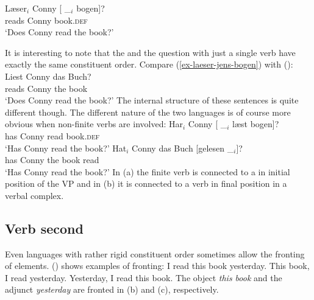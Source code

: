 \ex
\gll Læser$_i$ Conny [ \_$_i$ bogen]?\\
     reads     Conny {}        {}     book.\textsc{def}\\
\glt `Does Conny read the book?'
\zl

\noindent
It is interesting to note that the  and the  question with just a single verb have exactly
the same constituent order. Compare (\ref{ex-laeser-jens-bogen}) with ():
\ea
\gll Liest Conny das Buch?\\
     reads Conny the book\\ \german
\glt `Does Conny read the book?'
\z
The internal structure of these sentences is quite different though. The different nature of the two
languages is of course more obvious when non-finite verbs are involved:
\eal
\ex
\gll Har$_i$ Conny [ \_$_i$ læst bogen]?\\
     has Conny {} {} read book.\textsc{def}\\\danish
\glt `Has Conny read the book?'
\ex
\gll Hat$_i$ Conny das Buch [gelesen \_$_i$]?\\
     has Conny the book \spacebr{}read\\ \german
\glt `Has Conny read the book?'
\zl
In (a) the finite verb is connected to a  in initial position of the VP and in
(b) it is connected to a verb in final position in a verbal complex.%


\subsection{Verb second}
\label{sce-verb-second}

Even languages with rather rigid constituent order sometimes allow the fronting of elements.
() shows  examples of fronting:
\eal
\ex I read this book yesterday.
\ex This book, I read yesterday.
\ex Yesterday, I read this book.
\zl
The object \emph{this book} and the adjunct \emph{yesterday} are fronted in (b) and
(c), respectively.

